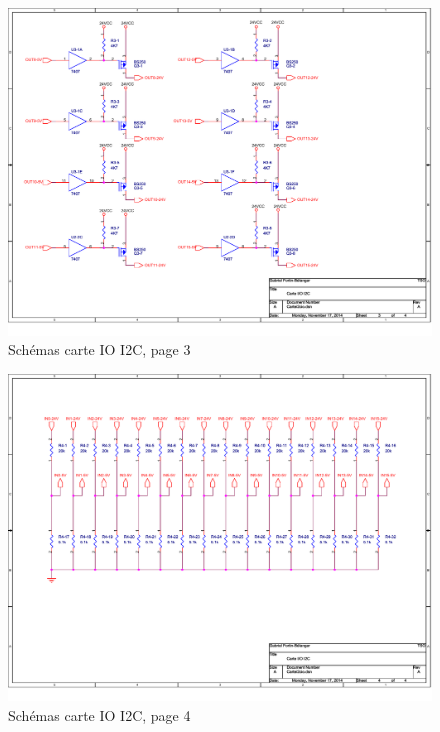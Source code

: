 \documentclass[10pt,a4paper,final]{article}
\begin{document}
\begin{spacing}{1.5}
\begin{figure}[hbtp]
\caption{Schémas carte IO I2C, page 3}
\centering
\includegraphics[scale=0.87,angle=90]{Figures/OrCad/PAGE3.pdf}
\end{figure}

\begin{figure}[hbtp]
\caption{Schémas carte IO I2C, page 4}
\centering
\includegraphics[scale=0.87,angle=90]{Figures/OrCad/PAGE4.pdf}
\end{figure}

\vfill
\pagebreak

\begin{figure}[hbtp]

\end{figure}
\end{spacing}
\end{document}
